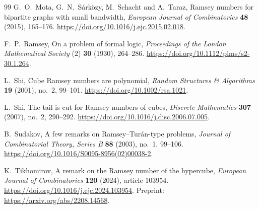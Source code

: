 \begin{thebibliography}{99}
G.~O.~Mota, G.~N.~S\'ark\"ozy, M.~Schacht and A.~Taraz,
Ramsey numbers for bipartite graphs with small bandwidth,
\emph{European Journal of Combinatorics} \textbf{48}
(2015), 165--176.
\url{https://doi.org/10.1016/j.ejc.2015.02.018}.

F.~P.~Ramsey,
On a problem of formal logic,
\emph{Proceedings of the London Mathematical Society}
(2) \textbf{30} (1930), 264--286.
\url{https://doi.org/10.1112/plms/s2-30.1.264}.

L.~Shi,
Cube Ramsey numbers are polynomial,
\emph{Random Structures \& Algorithms} \textbf{19} (2001), no.~2, 99--101.
\url{https://doi.org/10.1002/rsa.1021}.

L.~Shi,
The tail is cut for Ramsey numbers of cubes,
\emph{Discrete Mathematics} \textbf{307} (2007), no.~2, 290--292.
\url{https://doi.org/10.1016/j.disc.2006.07.005}.

B.~Sudakov,
A few remarks on Ramsey--Tur\'an-type problems,
\emph{Journal of Combinatorial Theory, Series B}
\textbf{88} (2003), no.~1, 99--106.
\url{https://doi.org/10.1016/S0095-8956(02)00038-2}.

K.~Tikhomirov,
A remark on the Ramsey number of the hypercube,
\emph{European Journal of Combinatorics} \textbf{120}
(2024), article 103954.
\url{https://doi.org/10.1016/j.ejc.2024.103954}.
Preprint: \url{https://arxiv.org/abs/2208.14568}.

\end{thebibliography}
